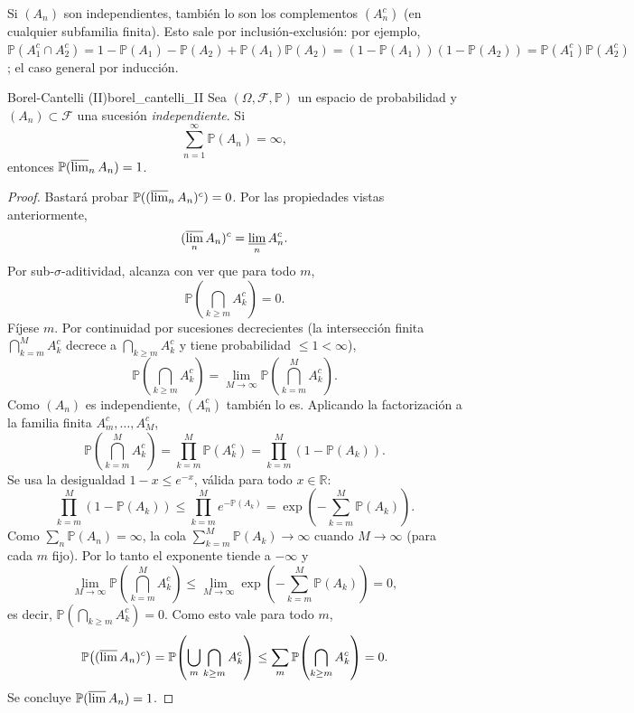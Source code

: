 \documentclass[11pt, a4paper]{article}
\begin{document}
\obs Si $(A_n)$ son independientes, también lo son los complementos $(A_n^c)$ (en cualquier
subfamilia finita). Esto sale por inclusión-exclusión: por ejemplo, $\mathbb{P}(A_1^c \cap
A_2^c) = 1 - \mathbb{P}(A_1) - \mathbb{P}(A_2) + \mathbb{P}(A_1) \mathbb{P}(A_2) = (1 -
\mathbb{P}(A_1))(1 - \mathbb{P}(A_2)) = \mathbb{P}(A_1^c) \mathbb{P}(A_2^c)$; el caso general por
inducción.

\begin{teorema}{Borel-Cantelli (II)}{borel_cantelli_II}
Sea $(\Omega, \mathcal{F}, \mathbb{P})$ un espacio de probabilidad y $(A_n) \subset \mathcal{F}$ una
sucesión \emph{independiente}. Si
$$ \sum_{n=1}^\infty \mathbb{P}(A_n) = \infty, $$
entonces $\mathbb{P}(\varlimsup_n A_n) = 1$.
\end{teorema}

\begin{proof}
Bastará probar $\mathbb{P}((\varlimsup_n A_n)^c) = 0$. Por las propiedades vistas anteriormente,
$$ (\varlimsup_n A_n)^c = \varliminf_n A_n^c. $$
Por sub-$\sigma$-aditividad, alcanza con ver que para todo $m$,
$$ \mathbb{P}\!\left(\bigcap_{k \ge m} A_k^c\right) = 0. $$
Fíjese $m$. Por continuidad por sucesiones decrecientes (la intersección finita $\bigcap_{k =
m}^M A_k^c$ decrece a $\bigcap_{k \ge m} A_k^c$ y tiene probabilidad $\le 1 < \infty$),
$$ \mathbb{P}\!\left(\bigcap_{k \ge m} A_k^c\right) = \lim_{M \to \infty} \mathbb{P}\!\left(
\bigcap_{k = m}^M A_k^c\right). $$
Como $(A_n)$ es independiente, $(A_n^c)$ también lo es. Aplicando la
factorización a la familia finita $A_m^c, \dots, A_M^c$,
$$ \mathbb{P}\!\left(\bigcap_{k = m}^M A_k^c\right) = \prod_{k = m}^M \mathbb{P}(A_k^c) =
\prod_{k = m}^M (1 - \mathbb{P}(A_k)). $$
Se usa la desigualdad $1 - x \le e^{-x}$, válida para todo $x \in \mathbb{R}$:
$$ \prod_{k = m}^M (1 - \mathbb{P}(A_k)) \le \prod_{k = m}^M e^{-\mathbb{P}(A_k)} =
\exp\!\left(-\sum_{k = m}^M \mathbb{P}(A_k)\right). $$
Como $\sum_n \mathbb{P}(A_n) = \infty$, la cola $\sum_{k = m}^M \mathbb{P}(A_k) \to \infty$ cuando
$M \to \infty$ (para cada $m$ fijo). Por lo tanto el exponente tiende a $-\infty$ y
$$ \lim_{M \to \infty} \mathbb{P}\!\left(\bigcap_{k = m}^M A_k^c\right) \le \lim_{M \to \infty}
\exp\!\left(-\sum_{k = m}^M \mathbb{P}(A_k)\right) = 0, $$
es decir, $\mathbb{P}(\bigcap_{k \ge m} A_k^c) = 0$. Como esto vale para todo $m$,
$$ \mathbb{P}\!\left((\varlimsup A_n)^c\right) = \mathbb{P}\!\left(\bigcup_m \bigcap_{k \ge m}
A_k^c\right) \le \sum_m \mathbb{P}\!\left(\bigcap_{k \ge m} A_k^c\right) = 0. $$
Se concluye $\mathbb{P}(\varlimsup A_n) = 1$.
\end{proof}
\end{document}

